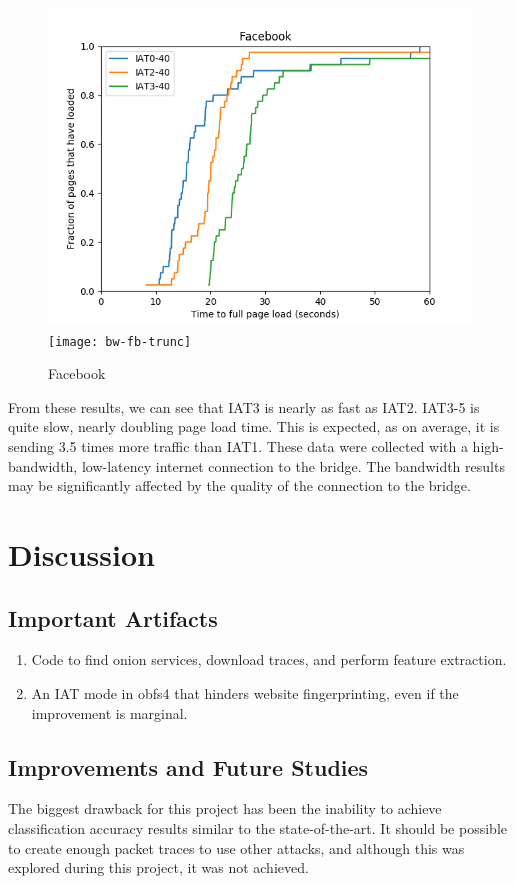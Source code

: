 \documentclass[11pt]{article}
\begin{document}
\begin{figure}[h]
    \centering
    \includegraphics[scale=.45]{bw-fb}
    \texttt{[image: bw-fb-trunc]}
    \caption[]{Facebook}
\end{figure}

From these results, we can see that IAT3 is nearly as fast as IAT2. IAT3-5 is quite slow, nearly doubling page load time. This is expected, as on average, it is sending 3.5 times more traffic than IAT1.
These data were collected with a high-bandwidth, low-latency internet connection to the bridge. The bandwidth results may be significantly affected by the quality of the connection to the bridge.

\section{Discussion}
\subsection{Important Artifacts}
\begin{enumerate}
    \item Code to find onion services, download traces, and perform feature extraction.
    \item An IAT mode in obfs4 that hinders website fingerprinting, even if the improvement is marginal.
\end{enumerate}
\subsection{Improvements and Future Studies}
The biggest drawback for this project has been the inability to achieve classification accuracy results similar to the state-of-the-art. It should be possible to create enough packet traces to use other attacks, and although this was explored during this project, it was not achieved.
\end{document}
